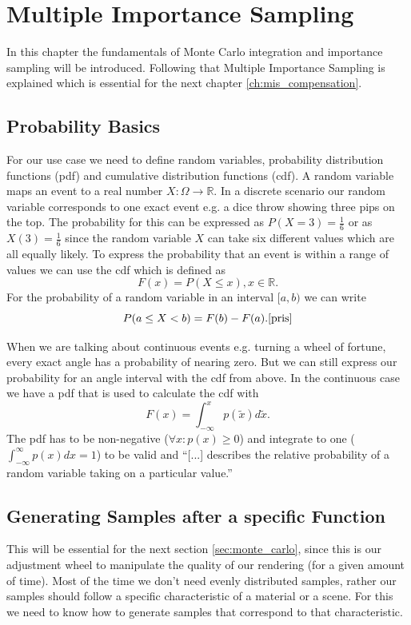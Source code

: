 \chapter{Multiple Importance Sampling}
\label{ch:mis}

In this chapter the fundamentals of Monte Carlo integration and importance sampling will be introduced.
Following that Multiple Importance Sampling is explained which is essential for the next chapter \ref{ch:mis_compensation}.


\section{Probability Basics}
\label{sec:probability_basics}
For our use case we need to define random variables, probability distribution functions (pdf) and cumulative distribution functions (cdf).
A random variable maps an event to a real number $ X: \Omega \to \mathbb{R} $.
In a discrete scenario our random variable corresponds to one exact event e.g. a dice throw showing three pips on the top.
The probability for this can be expressed as $ P(X = 3) = \frac{1}{6} $ or as $ X(3) = \frac{1}{6} $
since the random variable $ X $ can take six different values which are all equally likely.
To express the probability that an event is within a range of values we can use the cdf
which is defined as $$ F(x) = P(X \leq x), x \in \mathbb{R}. $$
For the probability of a random variable in an interval $ [a, b) $ we can write $$ P(a \leq X < b) = F(b) - F(a). \cite{pris} $$

When we are talking about continuous events e.g. turning a wheel of fortune, every exact angle has a probability of nearing zero.
But we can still express our probability for an angle interval with the cdf from above.
In the continuous case we have a pdf that is used to calculate the cdf with $$ F(x) = \int_{-\infty}^x p(\tilde{x}) d\tilde{x}. $$
The pdf has to be non-negative ($ \forall x: p(x) \geq 0 $) and integrate to one ($ \int_{-\infty}^{\infty} p(x) dx = 1$) to be valid and
\enquote{[...] describes the relative probability of a random variable taking on a particular value.}\cite[Chapter~13.1]{pbr-book}


\section{Generating Samples after a specific Function}
\label{sec:sample_generation}
This will be essential for the next section \ref{sec:monte_carlo},
since this is our adjustment wheel to manipulate the quality of our rendering (for a given amount of time).
Most of the time we don't need evenly distributed samples,
rather our samples should follow a specific characteristic of a material or a scene.
For this we need to know how to generate samples that correspond to that characteristic.

